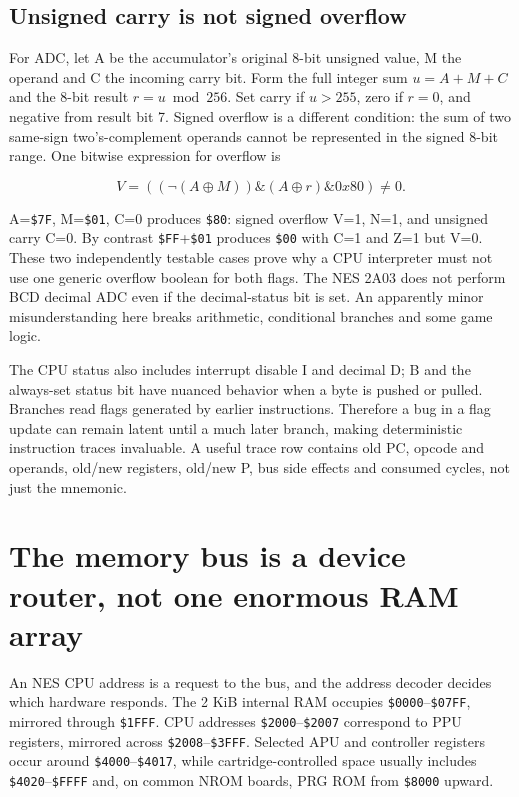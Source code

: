 \subsection{Unsigned carry is not signed overflow}\label{06-engine-ii-ch042-unsigned-carry-is-not-signed-overflow}

For ADC, let A be the accumulator's original 8-bit unsigned value, M the operand and C the incoming carry bit. Form the full integer sum \(u=A+M+C\) and the 8-bit result \(r=u\bmod256\). Set carry if \(u>255\), zero if \(r=0\), and negative from result bit 7. Signed overflow is a different condition: the sum of two same-sign two's-complement operands cannot be represented in the signed 8-bit range. One bitwise expression for overflow is

\[
V= ((\neg(A\oplus M))\mathbin{\&}(A\oplus r)\mathbin{\&}0x80)\ne0.
\]

A=\texttt{\$7F}, M=\texttt{\$01}, C=0 produces \texttt{\$80}: signed overflow V=1, N=1, and unsigned carry C=0. By contrast \texttt{\$FF}+\texttt{\$01} produces \texttt{\$00} with C=1 and Z=1 but V=0. These two independently testable cases prove why a CPU interpreter must not use one generic overflow boolean for both flags. The NES 2A03 does not perform BCD decimal ADC even if the decimal-status bit is set. An apparently minor misunderstanding here breaks arithmetic, conditional branches and some game logic.

The CPU status also includes interrupt disable I and decimal D; B and the always-set status bit have nuanced behavior when a byte is pushed or pulled. Branches read flags generated by earlier instructions. Therefore a bug in a flag update can remain latent until a much later branch, making deterministic instruction traces invaluable. A useful trace row contains old PC, opcode and operands, old/new registers, old/new P, bus side effects and consumed cycles, not just the mnemonic.

\section{The memory bus is a device router, not one enormous RAM array}\label{06-engine-ii-ch042-the-memory-bus-is-a-device-router-not-one-enormous-ram-array}

An NES CPU address is a request to the bus, and the address decoder decides which hardware responds. The 2 KiB internal RAM occupies \texttt{\$0000}--\texttt{\$07FF}, mirrored through \texttt{\$1FFF}. CPU addresses \texttt{\$2000}--\texttt{\$2007} correspond to PPU registers, mirrored across \texttt{\$2008}--\texttt{\$3FFF}. Selected APU and controller registers occur around \texttt{\$4000}--\texttt{\$4017}, while cartridge-controlled space usually includes \texttt{\$4020}--\texttt{\$FFFF} and, on common NROM boards, PRG ROM from \texttt{\$8000} upward.

